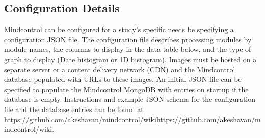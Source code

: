 \subsection{Configuration Details}

Mindcontrol can be configured for a study's specific needs be specifying a configuration JSON file. The configuration file describes processing modules by module names, the columns to display in the data table below, and the type of graph to display (Date histogram or 1D histogram). Images must be hosted on a separate server or a content delivery network (CDN) and the Mindcontrol database populated with URLs to these images. An initial JSON file can be specified to populate the Mindcontrol MongoDB with entries on startup if the database is empty. Instructions and example JSON schema for the configuration file and the database entries can be found at \url{https://github.com/akeshavan/mindcontrol/wiki}{https://github.com/akeshavan/mindcontrol/wiki}. 

